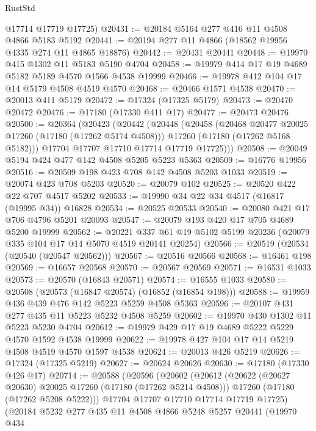 \begin{lexlean}{RustStd}
\begin{coremodule}
{\begin{coremodule}
{{{{{{{{{{{{{{{{{{{{{{{{{{{{{{{{{{{{{{{{{{{{{{{{{{{{{{{      @17714
      @17719
      @17725)
@20431 := @20184 @5164 @277 @416 @11 @4508 @4866 @5183 @5192
@20441 := @20194 @277 @11 @4866 (@18562 @19956 @4335 @274 @11 @4865 @18876)
@20442 := @20431 @20441
@20448 := @19970 @415 @1302 @11 @5183 @5190 @4704
@20458 := @19979 @414 @17 @19 @4689 @5182 @5189 @4570 @1566 @4538 @19999
@20466 := @19978 @412 @104 @17 @14 @5179 @4508 @4519 @4570
@20468 := @20466 @1571 @4538
@20470 := @20013 @411 @5179
@20472 := @17324 (@17325 @5179)
@20473 := @20470 @20472
@20476 := @17180 (@17330 @411 @17)
@20477 := @20473 @20476
@20500 := @20364
    (@20423
      (@20442
        (@20448
          (@20458
            (@20468 @20477 @20025 @17260 (@17180 (@17262 @5174 @4508)))
            @17260
            (@17180 (@17262 @5168 @5182)))
          @17704
          @17707
          @17710
          @17714
          @17719
          @17725)))
@20508 := @20049 @5194 @424 @477 @142 @4508 @5205 @5223 @5363
@20509 := @16776 @19956
@20516 := @20509 @198 @423 @708 @142 @4508 @5203 @1033
@20519 := @20074 @423 @708 @5203
@20520 := @20079 @102
@20525 := @20520 @422 @22 @707 @4517 @5202
@20533 := @19990 @34 @22 @34 @4517 (@16817 (@19995 @34)) @16828
@20534 := @20525 @20533
@20540 := @20080 @421 @17 @706 @4796 @5201 @20093
@20547 := @20079 @193 @420 @17 @705 @4689 @5200 @19999
@20562 := @20221
    @337
    @61
    @19
    @5102
    @5199
    @20236
    (@20079 @335 @104 @17 @14 @5070 @4519 @20141 @20254)
@20566 := @20519 (@20534 (@20540 (@20547 @20562)))
@20567 := @20516 @20566
@20568 := @16461 @198
@20569 := @16657 @20568
@20570 := @20567 @20569
@20571 := @16531 @1033
@20573 := @20570 (@16843 @20571)
@20574 := @16555 @1033
@20580 := @20508 (@20573 (@16847 @20574) (@16852 (@16854 @198)))
@20588 := @19959 @436 @439 @476 @142 @5223 @5259 @4508 @5363
@20596 := @20107 @431 @277 @435 @11 @5223 @5232 @4508 @5259
@20602 := @19970 @430 @1302 @11 @5223 @5230 @4704
@20612 := @19979 @429 @17 @19 @4689 @5222 @5229 @4570 @1592 @4538 @19999
@20622 := @19978 @427 @104 @17 @14 @5219 @4508 @4519 @4570 @1597 @4538
@20624 := @20013 @426 @5219
@20626 := @17324 (@17325 @5219)
@20627 := @20624 @20626
@20630 := @17180 (@17330 @426 @17)
@20714 := @20588
    (@20596
      (@20602
        (@20612
          (@20622 (@20627 @20630) @20025 @17260 (@17180 (@17262 @5214 @4508)))
          @17260
          (@17180 (@17262 @5208 @5222)))
        @17704
        @17707
        @17710
        @17714
        @17719
        @17725)
      (@20184
        @5232
        @277
        @435
        @11
        @4508
        @4866
        @5248
        @5257
        @20441
        (@19970
          @434
}}}}}}}}}}}}}}}}}}}}}}}}}}}}}}}}}}}}}}}}}}}}}}}}}}}}}}}
\end{coremodule}}
\end{coremodule}
\end{lexlean}
